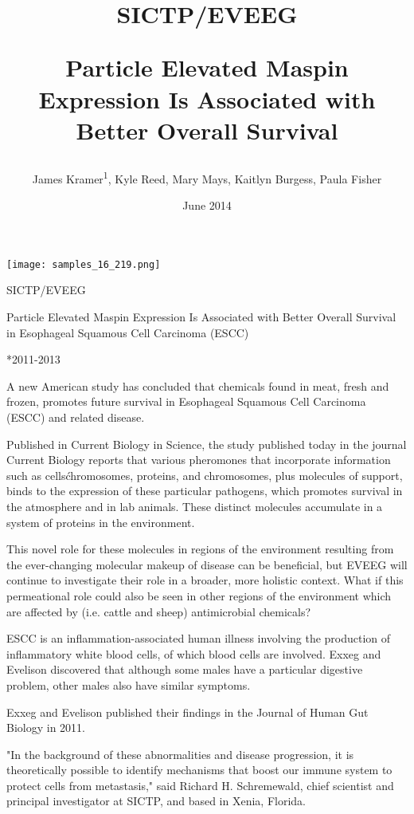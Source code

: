 \documentclass{article}
\title{SICTP/EVEEG

Particle Elevated Maspin Expression Is Associated with Better Overall Survival}
\author{James Kramer\textsuperscript{1},  Kyle Reed,  Mary Mays,  Kaitlyn Burgess,  Paula Fisher}
\affil{\textsuperscript{1}Shandong University}
\date{June 2014}
\begin{document}
\maketitle

\begin{center}
\begin{minipage}{0.75\linewidth}
\texttt{[image: samples\_16\_219.png]}
\end{minipage}
\end{center}

SICTP/EVEEG

Particle Elevated Maspin Expression Is Associated with Better Overall Survival in Esophageal Squamous Cell Carcinoma (ESCC)

*2011-2013

A new American study has concluded that chemicals found in meat, fresh and frozen, promotes future survival in Esophageal Squamous Cell Carcinoma (ESCC) and related disease.

Published in Current Biology in Science, the study published today in the journal Current Biology reports that various pheromones that incorporate information such as cells\' chromosomes, proteins, and chromosomes, plus molecules of support, binds to the expression of these particular pathogens, which promotes survival in the atmosphere and in lab animals. These distinct molecules accumulate in a system of proteins in the environment.

This novel role for these molecules in regions of the environment resulting from the ever-changing molecular makeup of disease can be beneficial, but EVEEG will continue to investigate their role in a broader, more holistic context. What if this permeational role could also be seen in other regions of the environment which are affected by (i.e. cattle and sheep) antimicrobial chemicals?

ESCC is an inflammation-associated human illness involving the production of inflammatory white blood cells, of which blood cells are involved. Exxeg and Evelison discovered that although some males have a particular digestive problem, other males also have similar symptoms.

Exxeg and Evelison published their findings in the Journal of Human Gut Biology in 2011.

"In the background of these abnormalities and disease progression, it is theoretically possible to identify mechanisms that boost our immune system to protect cells from metastasis," said Richard H. Schremewald, chief scientist and principal investigator at SICTP, and based in Xenia, Florida.
\end{document}
